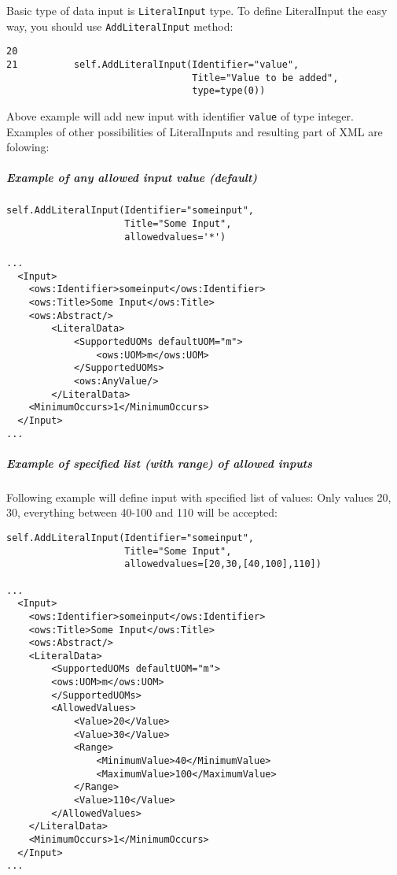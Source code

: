 \documentclass[a4paper,11pt]{article}
\begin{document}
Basic type of data input is \texttt{LiteralInput} type. To define
LiteralInput the easy way, you should use \texttt{AddLiteralInput} method:

\begin{verbatim}
20
21          self.AddLiteralInput(Identifier="value",
                                 Title="Value to be added",
                                 type=type(0))
\end{verbatim}

Above example will add new input with identifier \texttt{value} of type
integer. Examples of other possibilities of LiteralInputs and resulting
part of XML are folowing:

\subparagraph{Example of any allowed input value (default)}
\begin{verbatim}
self.AddLiteralInput(Identifier="someinput", 
                     Title="Some Input", 
                     allowedvalues='*')

...
  <Input>
    <ows:Identifier>someinput</ows:Identifier>
    <ows:Title>Some Input</ows:Title>
    <ows:Abstract/>
        <LiteralData>
            <SupportedUOMs defaultUOM="m">
                <ows:UOM>m</ows:UOM>
            </SupportedUOMs>
            <ows:AnyValue/>
        </LiteralData>
    <MinimumOccurs>1</MinimumOccurs>
  </Input>
...
\end{verbatim}

\subparagraph{Example of specified list (with range) of allowed inputs}

Following example will define input with specified list of values: Only
values 20, 30, everything between 40-100 and 110 will be accepted:
\begin{verbatim}
self.AddLiteralInput(Identifier="someinput",
                     Title="Some Input",
                     allowedvalues=[20,30,[40,100],110])

...
  <Input>
    <ows:Identifier>someinput</ows:Identifier>
    <ows:Title>Some Input</ows:Title>
    <ows:Abstract/>
    <LiteralData>
    	<SupportedUOMs defaultUOM="m">
        <ows:UOM>m</ows:UOM>
        </SupportedUOMs>
        <AllowedValues>
            <Value>20</Value>
            <Value>30</Value>
            <Range>
                <MinimumValue>40</MinimumValue>
                <MaximumValue>100</MaximumValue>
            </Range>
            <Value>110</Value>
        </AllowedValues>
    </LiteralData>
    <MinimumOccurs>1</MinimumOccurs>
  </Input>
...
\end{verbatim}
\end{document}
